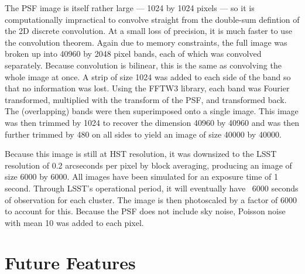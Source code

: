 \documentclass[10pt,twoside]{article}
\theoremstyle{definition}
\theoremstyle{exercise}
\begin{document}
The PSF image is itself rather large --- 1024 by 1024 pixels --- so it is computationally impractical to convolve straight from the double-sum defintion of the 2D discrete convolution. At a small loss of precision, it is much faster to use the convolution theorem. Again due to memory constraints, the full image was broken up into 40960 by 2048 pixel bands, each of which was convolved separately. Because convolution is bilinear, this is the same as convolving the whole image at once. A strip of size 1024 was added to each side of the band so that no information was lost. Using the FFTW3 library, each band was Fourier transformed, multiplied with the transform of the PSF, and transformed back. The (overlapping) bands were then superimposed onto a single image. This image was then trimmed by 1024 to recover the dimension 40960 by 40960 and was then further trimmed by 480 on all sides to yield an image of size 40000 by 40000. 

Because this image is still at HST resolution, it was downsized to the LSST resolution of 0.2 arcseconds per pixel by block averaging, producing an image of size 6000 by 6000. All images have been simulated for an exposure time of 1 second. Through LSST's operational period, it will eventually have ~6000 seconds of observation for each cluster. The image is then photoscaled by a factor of 6000 to account for this. Because the PSF does not include sky noise, Poisson noise with mean 10 was added to each pixel.

\section{Future Features}
\end{document}
